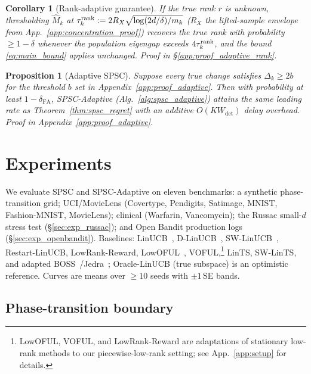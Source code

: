 \documentclass{article}
\newtheorem{corollary}[theorem]{Corollary}
\newtheorem{proposition}[theorem]{Proposition}
\begin{document}
\begin{corollary}[Rank-adaptive guarantee]
\label{cor:rank_adaptive}
If the true rank $r$ is unknown, thresholding $\widehat M_k$
at $\tau_k^{\rm rank} := 2R_X\sqrt{\log(2d/\delta)/m_k}$
($R_X$ the lifted-sample envelope from
App.~\ref{app:concentration_proof}) recovers the true rank with
probability $\ge 1-\delta$ whenever the population eigengap exceeds
$4\tau_k^{\rm rank}$, and the bound \eqref{eq:main_bound} applies
unchanged. Proof in \S\ref{app:proof_adaptive_rank}.
\end{corollary}

\begin{proposition}[Adaptive SPSC]
  \label{thm:spsc_adaptive}
  Suppose every true change satisfies $\Delta_k\ge 2b$ for the
  threshold $b$ set in Appendix~\ref{app:proof_adaptive}. Then with
  probability at least $1-\delta_{\mathrm{FA}}$, SPSC-Adaptive
  (Alg.~\ref{alg:spsc_adaptive}) attains the same leading rate as
  Theorem~\ref{thm:spsc_regret} with an additive $O(K W_{\mathrm{det}})$
  delay overhead. Proof in Appendix~\ref{app:proof_adaptive}.
  \end{proposition}


\section{Experiments}
\label{sec:experiments}

We evaluate SPSC and SPSC-Adaptive on eleven benchmarks: a synthetic
phase-transition grid; UCI/MovieLens (Covertype, Pendigits, Satimage,
MNIST, Fashion-MNIST, MovieLens); clinical (Warfarin, Vancomycin);
the Russac small-$d$ stress test (\S\ref{sec:exp_russac}); and Open
Bandit production logs (\S\ref{sec:exp_openbandit}). Baselines:
LinUCB~\citep{abbasi2011improved}, D-LinUCB~\citep{russac2019weighted},
SW-LinUCB~\citep{cheung2019learning}, Restart-LinUCB, LowRank-Reward,
LowOFUL~\citep{jun2019bilinear}, VOFUL,\footnote{LowOFUL, VOFUL, and
LowRank-Reward are adaptations of stationary low-rank methods to our
piecewise-low-rank setting; see App.~\ref{app:setup} for details.}
LinTS, SW-LinTS, and adapted BOSS~\citep{duong2024beyond}/Jedra~\citep{jedra2024low};
Oracle-LinUCB (true subspace) is an optimistic reference. Curves are
means over $\ge 10$ seeds with $\pm 1$\,SE bands.

\subsection{Phase-transition boundary}
\label{sec:exp_phase}
\end{document}
